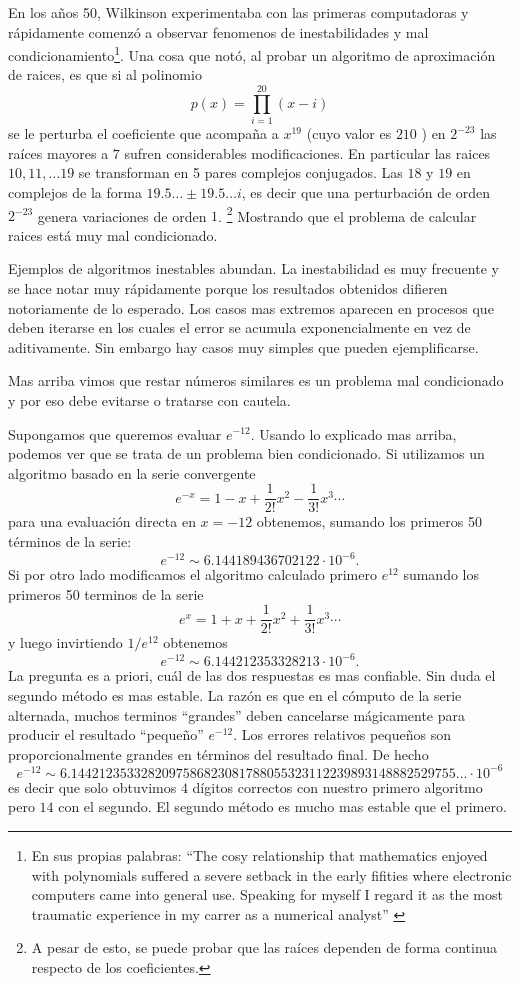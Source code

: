 En los años 50, Wilkinson experimentaba con las primeras computadoras y rápidamente comenzó a observar fenomenos de inestabilidades y mal condicionamiento\footnote{En sus propias palabras: ``The cosy relationship that mathematics enjoyed with polynomials suffered a severe setback in the early fifities where electronic computers came into general use. Speaking for myself I regard it as the most traumatic experience in my carrer as a numerical analyst'' \cite{Wil}  }. Una cosa que notó, al probar un algoritmo de aproximación de raices, es que si al polinomio
$$
p(x)=\prod_{i=1}^{20}(x-i)
$$
se le perturba el coeficiente que acompaña a $x^{19}$ (cuyo valor es $210$ ) en $2^{-23}$ las raíces mayores a $7$ sufren considerables modificaciones. En particular las raices  $10,11,\dots 19$
se transforman en 5 pares complejos conjugados. Las $18$ y $19$ en complejos de la forma $19.5\dots\pm 19.5\dots i$, es decir que una perturbación de orden $2^{-23}$ genera variaciones de orden $1$. \footnote{A pesar de esto, se puede probar que las raíces dependen de forma continua respecto de los coeficientes.} Mostrando que el problema de calcular raices está muy mal condicionado.

Ejemplos de algoritmos inestables abundan. La inestabilidad es muy frecuente y se hace notar muy rápidamente porque los resultados obtenidos difieren notoriamente de lo esperado. Los casos mas extremos aparecen en procesos que deben iterarse en los cuales el error se acumula exponencialmente en vez de aditivamente. Sin embargo hay casos muy simples que pueden ejemplificarse.


Mas arriba vimos que restar números similares es un problema mal condicionado y por eso debe evitarse o tratarse con cautela.

Supongamos que queremos evaluar $e^{-12}$. Usando lo explicado mas arriba, podemos ver que se trata de un problema bien condicionado.  Si utilizamos un algoritmo basado en la serie convergente
$$
e^{-x}=1-x+\frac{1}{2!}x^2-\frac{1}{3!}x^3\cdots
$$
para una evaluación directa en $x=-12$ obtenemos, sumando los primeros 50 términos de la serie:
$$
e^{-12}\sim 6.144189436702122\cdot 10^{-6}.$$
Si por otro lado modificamos el algoritmo calculado primero $e^{12}$
sumando los primeros 50 terminos de la serie
$$
e^{x}=1+x+\frac{1}{2!}x^2+\frac{1}{3!}x^3\cdots
$$
y luego invirtiendo $1/e^{12}$ obtenemos
$$e^{-12}\sim 6.144212353328213\cdot 10^{-6}.$$
La pregunta es a priori, cuál de las dos respuestas es mas confiable. Sin duda el segundo método es mas estable. La razón es que en el cómputo de la serie alternada, muchos terminos ``grandes'' deben cancelarse mágicamente para producir el resultado ``pequeño'' $e^{-12}$. Los errores relativos pequeños son proporcionalmente grandes en términos del resultado final. De hecho
$$e^{-12}\sim 6.1442123533282097586823081788055323112239893148882529755...\cdot 10^{-6}$$
es decir que solo obtuvimos $4$ dígitos correctos con nuestro primero algoritmo pero $14$ con el segundo.
El segundo método es mucho mas estable que el primero.


